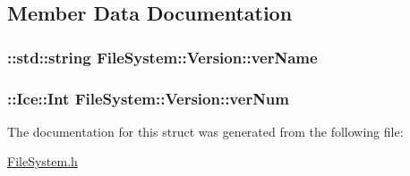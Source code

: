 \subsection{Member Data Documentation}
\hypertarget{struct_file_system_1_1_version_ae304c0f218e096f2d6edf7aef9f29068}{}
\subsubsection[{ver\+Name}]{\setlength{\rightskip}{0pt plus 5cm}\+::std\+::string File\+System\+::\+Version\+::ver\+Name}\label{struct_file_system_1_1_version_ae304c0f218e096f2d6edf7aef9f29068}
\hypertarget{struct_file_system_1_1_version_afdc710dd81f2d721b432b3baa58ec58a}{}
\subsubsection[{ver\+Num}]{\setlength{\rightskip}{0pt plus 5cm}\+::Ice\+::\+Int File\+System\+::\+Version\+::ver\+Num}\label{struct_file_system_1_1_version_afdc710dd81f2d721b432b3baa58ec58a}


The documentation for this struct was generated from the following file\+:\begin{DoxyCompactItemize}
\item 
\hyperlink{_file_system_8h}{File\+System.\+h}\end{DoxyCompactItemize}
